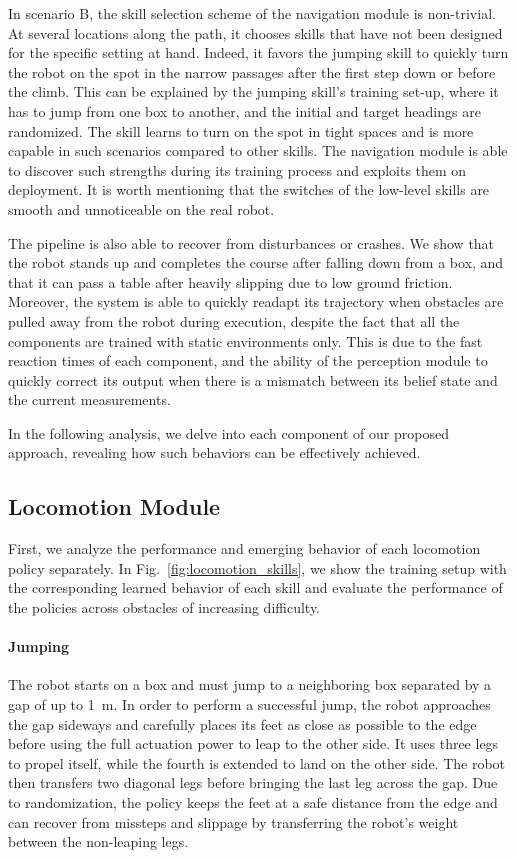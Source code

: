 \documentclass[conference]{IEEEtran}
\begin{document}
In scenario B, the skill selection scheme of the navigation module is non-trivial. At several locations along the path, it chooses skills that have not been designed for the specific setting at hand. Indeed, it favors the jumping skill to quickly turn the robot on the spot in the narrow passages after the first step down or before the climb. This can be explained by the jumping skill's training set-up, where it has to jump from one box to another, and the initial and target headings are randomized. The skill learns to turn on the spot in tight spaces and is more capable in such scenarios compared to other skills. The navigation module is able to discover such strengths during its training process and exploits them on deployment.
It is worth mentioning that the switches of the low-level skills are smooth and unnoticeable on the real robot.

The pipeline is also able to recover from disturbances or crashes. We show that the robot stands up and completes the course after falling down from a box, and that it can pass a table after heavily slipping due to low ground friction. Moreover, the system is able to quickly readapt its trajectory when obstacles are pulled away from the robot during execution, despite the fact that all the components are trained with static environments only. This is due to the fast reaction times of each component, and the ability of the perception module to quickly correct its output when there is a mismatch between its belief state and the current measurements.

In the following analysis, we delve into each component of our proposed approach, revealing how such behaviors can be effectively achieved.

\subsection{Locomotion Module}
First, we analyze the performance and emerging behavior of each locomotion policy separately. In Fig.~\ref{fig:locomotion_skills}, we show the training setup with the corresponding learned behavior of each skill and evaluate the performance of the policies across obstacles of increasing difficulty.

\paragraph{Jumping}
The robot starts on a box and must jump to a neighboring box separated by a gap of up to \SI{1}{m}. 
In order to perform a successful jump, the robot approaches the gap sideways and carefully places its feet as close as possible to the edge before using the full actuation power to leap to the other side. It uses three legs to propel itself, while the fourth is extended to land on the other side. The robot then transfers two diagonal legs before bringing the last leg across the gap. Due to randomization, the policy keeps the feet at a safe distance from the edge and can recover from missteps and slippage by transferring the robot's weight between the non-leaping legs.
\end{document}
